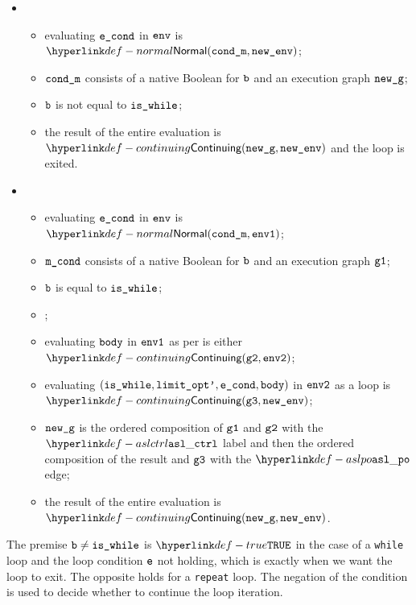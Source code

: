 \ProseParagraph
\OneApplies
\begin{itemize}
\item {}
  \begin{itemize}
    \item evaluating $\texttt{e\_cond}$ in $\texttt{env}$ is $\Normal(\condm, \newenv)$\ProseOrAbnormal;
    \item $\texttt{cond\_m}$ consists of a native Boolean for $\texttt{b}$ and an execution graph $\texttt{new\_g}$;
    \item $\texttt{b}$ is not equal to $\texttt{is\_while}$;
    \item the result of the entire evaluation is $\Continuing(\newg, \newenv)$
    and the loop is exited.
  \end{itemize}
\item {}
  \begin{itemize}
    \item evaluating $\texttt{e\_cond}$ in $\texttt{env}$ is $\Normal(\condm, \envone)$;
    \item $\texttt{m\_cond}$ consists of a native Boolean for $\texttt{b}$ and an execution graph $\texttt{g1}$;
    \item $\texttt{b}$ is equal to $\texttt{is\_while}$;
    \item \Proseticklooplimit{$\vlimitopt$}{$\vlimitoptp$}\ProseOrError;
    \item evaluating $\texttt{body}$ in $\texttt{env1}$ as per  is either \\
    $\Continuing(\vgtwo, \envtwo)$\ProseTerminateAs{\ReturningConfig, \ThrowingConfig, \DynErrorConfig};
    \item evaluating $(\texttt{is\_while}, \texttt{limit\_opt'}, \texttt{e\_cond}, \texttt{body})$ in $\texttt{env2}$ as a loop is \\
    $\Continuing(\vgthree, \newenv)$\ProseTerminateAs{\ReturningConfig, \ThrowingConfig, \DynErrorConfig};
    \item $\texttt{new\_g}$ is the ordered composition of $\texttt{g1}$ and $\texttt{g2}$ with the $\aslctrl$ label
    and then the ordered composition of the result and $\texttt{g3}$ with the $\aslpo$ edge;
    \item the result of the entire evaluation is $\Continuing(\newg, \newenv)$.
  \end{itemize}
\end{itemize}

\FormallyParagraph
The premise $\texttt{b} \neq \texttt{is\_while}$ is $\True$ in the case of a \texttt{while} loop
and the loop condition $\texttt{e}$ not holding, which is exactly when we want the
loop to exit. The opposite holds for a \texttt{repeat} loop.
The negation of the condition is used to decide whether to continue the loop iteration.

